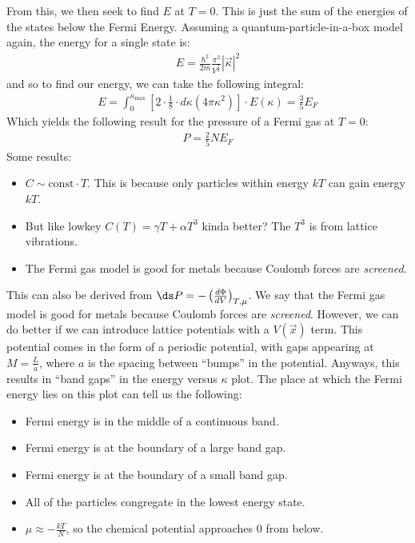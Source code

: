 \documentclass{article}
\begin{document}
From this, we then seek to find $E$ at $T=0$. This is just the sum of the energies of the states below the Fermi Energy. Assuming a quantum-particle-in-a-box model again, the energy for a single state is:
\begin{align*}
  E = \frac{\hbar^2}{2m}\frac{\pi^2}{V^\frac{2}{3}}|\vec{\kappa}|^2
\end{align*}
and so to find our energy, we can take the following integral:
\begin{align*}
  E = \int_{0}^{\kappa_\text{max}} \left[2 \cdot \frac{1}{8} \cdot d\kappa (4\pi \kappa^2)\right] \cdot E(\kappa) = \frac{3}{5}E_F
\end{align*}
Which yields the following result for the pressure of a Fermi gas at $T=0$:
\begin{align*}
  P = \frac{2}{5}NE_F
\end{align*}
Some results:
\begin{itemize}
\item $C \sim \text{const} \cdot T$. This is because only particles within energy $kT$ can gain energy $kT$.
\item But like lowkey $C(T) = \gamma T + \alpha T^3$ kinda better? The $T^3$ is from lattice vibrations.
\item The Fermi gas model is good for metals because Coulomb forces are \textit{screened}.
\end{itemize}
This can also be derived from $\ds P = - \left(\frac{d\Phi}{dV}\right)_{T, \mu}$.
\gap
We say that the Fermi gas model is good for metals because Coulomb forces are \textit{screened}. However, we can do better if we can introduce lattice potentials with a $V(\vec{x})$ term. This potential comes in the form of a periodic potential, with gaps appearing at $M = \frac{L}{a}$, where $a$ is the spacing between ``bumps'' in the potential.
\gap
Anyways, this results in ``band gaps'' in the energy versus $\kappa$ plot. The place at which the Fermi energy lies on this plot can tell us the following:
\begin{itemize}
\item {} Fermi energy is in the middle of a continuous band.
\item {} Fermi energy is at the boundary of a large band gap.
\item {} Fermi energy is at the boundary of a small band gap.
\end{itemize}
\vfill\pagebreak
{}
\begin{itemize}
\item All of the particles congregate in the lowest energy state.
\item $\mu \approx -\frac{kT}{N}$, so the chemical potential approaches 0 from below.
\end{itemize}
\end{document}
